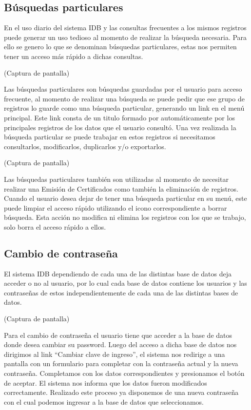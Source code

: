 \documentclass[a4paper,10pt]{article}
\begin{document}
\subsection{Búsquedas particulares}
En el uso diario del sistema IDB y las consultas frecuentes a los mismos registros puede generar un uso tedioso al momento de realizar la búsqueda necesaria. Para ello se genero lo que se denominan búsquedas particulares, estas nos permiten tener un acceso más rápido a dichas consultas.

(Captura de pantalla)

Las búsquedas particulares son búsquedas guardadas por el usuario para acceso frecuente, al momento de realizar una búsqueda se puede pedir que ese grupo de registros lo guarde como una búsqueda particular, generando un link en el menú principal. Este link consta de un titulo formado por automáticamente por los principales registros  de los  datos que el usuario consultó. Una vez realizada la búsqueda particular se puede trabajar en estos registros si necesitamos consultarlos,  modificarlos, duplicarlos y/o exportarlos.

(Captura de pantalla)

Las búsquedas particulares también son utilizadas al momento de necesitar realizar una Emisión de Certificados como también la eliminación de registros. 
Cuando el usuario desea dejar de tener una búsqueda particular en su menú, este puede limpiar el  acceso rápido utilizando el icono correspondiente a borrar búsqueda. Esta acción no modifica ni elimina los registros con los que se trabajo, solo borra el acceso rápido a ellos.
    
\subsection{Cambio de contraseña}

El sistema IDB dependiendo de cada una de las distintas base de datos deja acceder o no al usuario, por lo cual cada base de datos contiene los usuarios y las contraseñas de estos independientemente de cada una de las distintas bases de datos.

(Captura de pantalla)

Para el cambio de contraseña el usuario tiene que acceder a la base de datos donde desea cambiar su password. Luego del acceso a dicha base de datos nos dirigimos al link “Cambiar clave de ingreso”, el sistema nos redirige a una pantalla con un formulario para completar con la contraseña actual y la nueva contraseña. Completamos  con los datos correspondientes y presionamos el botón de aceptar. 
El sistema nos informa que los datos fueron modificados correctamente. Realizado este proceso ya disponemos de una nueva contraseña con el cual podemos ingresar a la base de datos que seleccionamos.
\end{document}
